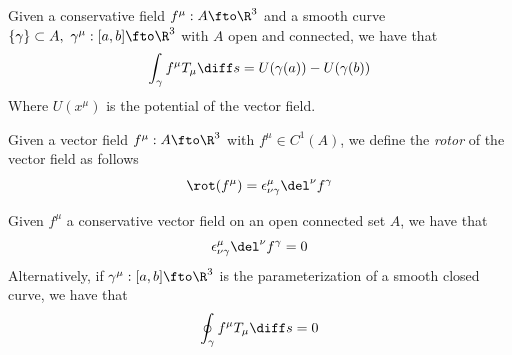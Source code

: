 \documentclass[../mmf.tex]{subfiles}
\begin{document}
\begin{thm}
	Given a conservative field $f^\mu:A\fto\R^3$ and a smooth curve $\{\gamma\}\subset A,\ \gamma^\mu:[a,b]\fto\R^3$ with $A$ open and connected, we have that
	\begin{equation}
		\int_{\gamma}^{}f^\mu T_\mu\diff s=U(\gamma(a))-U(\gamma(b))
		\label{eq:consfieldint}
	\end{equation}
	Where $U(x^\mu)$ is the potential of the vector field.
\end{thm}
\begin{dfn}[Rotor]
	Given a vector field $f^\mu:A\fto\R^3$ with $f^\mu\in C^1(A)$, we define the \textit{rotor} of the vector field as follows
	\begin{equation}
		\rot(f^\mu)=\epsilon^\mu_{\nu\gamma}\del^\nu f^\gamma
		\label{eq:rotor}
	\end{equation}
\end{dfn}
\begin{thm}
	Given $f^\mu$ a conservative vector field on an open connected set $A$, we have that
	\begin{equation}
		\epsilon^{\mu}_{\nu\gamma}\del^\nu f^\gamma=0
		\label{eq:nullrotor}
	\end{equation}
	Alternatively, if $\gamma^\mu:[a,b]\fto\R^3$ is the parameterization of a smooth closed curve, we have that
	\begin{equation}
		\oint_\gamma f^\mu T_\mu\diff s=0
		\label{eq:lineintcloscons}
	\end{equation}
\end{thm}
\end{document}
